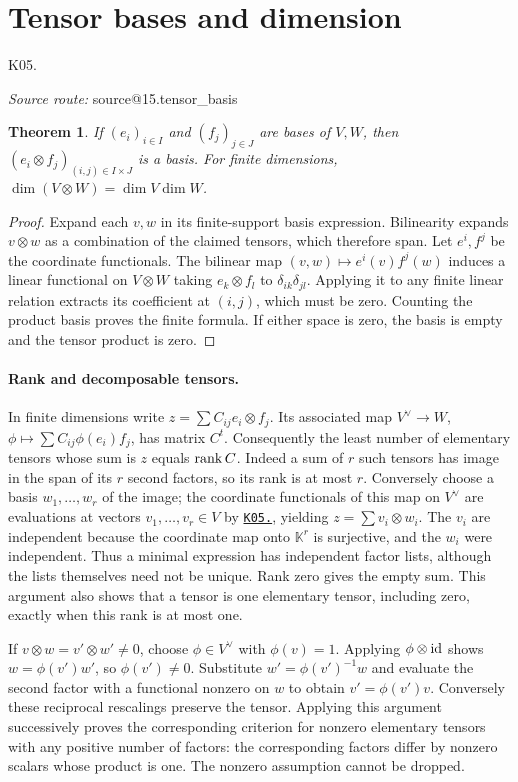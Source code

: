 \documentclass[11pt,a4paper]{book}
\makeatletter
\newtheorem{theorem}{Theorem}[chapter]
\theoremstyle{definition}\newtheorem{definition}[theorem]{Definition}
\theoremstyle{remark}\newtheorem{remark}[theorem]{Remark}
\newcommand{\K}{\mathbb K}\newcommand{\R}{\mathbb R}\newcommand{\C}{\mathbb C}
\newcommand{\kref}[1]{\hyperref[k:#1]{\texttt{K05.\detokenize{#1}}}}
\newcommand{\Kentry}[2]{\section{#2}\label{k:#1}\noindent\textsf{\small K05.\detokenize{#1}}\par
  \begingroup\small\color{black!65}\textit{Source route: }\csname source@#1\endcsname\par\endgroup}
\makeatother
\begin{document}
\Kentry{15.tensor_basis}{Tensor bases and dimension}
\begin{theorem}
If $(e_i)_{i\in I}$ and $(f_j)_{j\in J}$ are bases of $V,W$, then $(e_i\otimes f_j)_{(i,j)\in I\times J}$ is a basis. For finite dimensions, $\dim(V\otimes W)=\dim V\dim W$.
\end{theorem}
\begin{proof}
Expand each $v,w$ in its finite-support basis expression. Bilinearity expands $v\otimes w$ as a combination of the claimed tensors, which therefore span. Let $e^i,f^j$ be the coordinate functionals. The bilinear map $(v,w)\mapsto e^i(v)f^j(w)$ induces a linear functional on $V\otimes W$ taking $e_k\otimes f_l$ to $\delta_{ik}\delta_{jl}$. Applying it to any finite linear relation extracts its coefficient at $(i,j)$, which must be zero. Counting the product basis proves the finite formula. If either space is zero, the basis is empty and the tensor product is zero.
\end{proof}


\paragraph{Rank and decomposable tensors.}
In finite dimensions write $z=\sum C_{ij}e_i\otimes f_j$. Its associated map $V^\vee\to W$, $\phi\mapsto\sum C_{ij}\phi(e_i)f_j$, has matrix $C^t$. Consequently the least number of elementary tensors whose sum is $z$ equals $\operatorname{rank} C$. Indeed a sum of $r$ such tensors has image in the span of its $r$ second factors, so its rank is at most $r$. Conversely choose a basis $w_1,\ldots,w_r$ of the image; the coordinate functionals of this map on $V^\vee$ are evaluations at vectors $v_1,\ldots,v_r\in V$ by \kref{07.biddual}, yielding $z=\sum v_i\otimes w_i$. The $v_i$ are independent because the coordinate map onto $\K^r$ is surjective, and the $w_i$ were independent. Thus a minimal expression has independent factor lists, although the lists themselves need not be unique. Rank zero gives the empty sum. This argument also shows that a tensor is one elementary tensor, including zero, exactly when this rank is at most one.

If $v\otimes w=v'\otimes w'\ne0$, choose $\phi\in V^\vee$ with $\phi(v)=1$. Applying $\phi\otimes\operatorname{id}$ shows $w=\phi(v')w'$, so $\phi(v')\ne0$. Substitute $w'=\phi(v')^{-1}w$ and evaluate the second factor with a functional nonzero on $w$ to obtain $v'=\phi(v')v$. Conversely these reciprocal rescalings preserve the tensor. Applying this argument successively proves the corresponding criterion for nonzero elementary tensors with any positive number of factors: the corresponding factors differ by nonzero scalars whose product is one. The nonzero assumption cannot be dropped.
\end{document}
